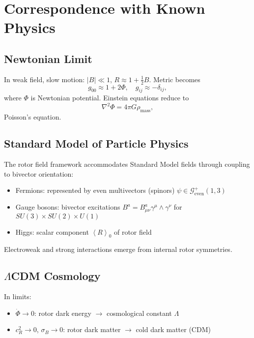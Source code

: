 \documentclass[11pt,a4paper]{article}
\numberwithin{equation}{section}
\theoremstyle{plain}
\theoremstyle{definition}
\theoremstyle{remark}
\newcommand{\Cl}{\mathcal{G}}               %
\newcommand{\grade}[2]{\left\langle #1 \right\rangle_{#2}}
\newcommand{\scal}[1]{\grade{#1}{0}}       %
\begin{document}
\section{Correspondence with Known Physics}
\label{sec:correspondence}

\subsection{Newtonian Limit}

In weak field, slow motion: $|B| \ll 1$, $R \approx 1 + \frac{1}{2}B$. Metric becomes
\begin{equation}
g_{00} \approx 1 + 2\Phi, \quad g_{ij} \approx -\delta_{ij},
\end{equation}
where $\Phi$ is Newtonian potential. Einstein equations reduce to
\begin{equation}
\nabla^2\Phi = 4\pi G\rho_{\mathrm{mass}},
\end{equation}
Poisson's equation.

\subsection{Standard Model of Particle Physics}

The rotor field framework accommodates Standard Model fields through coupling to bivector orientation:
\begin{itemize}
\item Fermions: represented by even multivectors (spinors) $\psi \in \Cl^+_{\mathrm{even}}(1,3)$
\item Gauge bosons: bivector excitations $B^a = B^a_{\mu\nu}\gamma^\mu \wedge \gamma^\nu$ for $SU(3) \times SU(2) \times U(1)$
\item Higgs: scalar component $\scal{R}$ of rotor field
\end{itemize}

Electroweak and strong interactions emerge from internal rotor symmetries.

\subsection{$\Lambda$CDM Cosmology}

In limits:
\begin{itemize}
\item $\dot{\Phi} \to 0$: rotor dark energy $\to$ cosmological constant $\Lambda$
\item $c_R^2 \to 0$, $\sigma_B \to 0$: rotor dark matter $\to$ cold dark matter (CDM)
\end{itemize}
\end{document}

